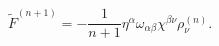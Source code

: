 \begin{equation}
 \tilde{F}^{(n+1)}
 =-\frac{1}{n+1}\eta^\alpha\omega_{\alpha\beta}\chi^{\beta\nu}\rho_\nu ^{(n)}.
 \label{a24}
 \end{equation}

